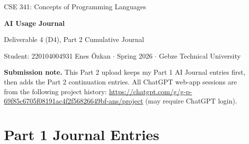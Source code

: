 \documentclass[11pt,a4paper]{article}
\newcommand{\field}[2]{\textbf{#1.} #2\par}
\begin{document}
\begin{center}
  {\footnotesize\color{anscaption}CSE 341: Concepts of Programming Languages\par}
  \vspace{3pt}
  {\huge\bfseries\sffamily AI Usage Journal\par}
  \vspace{4pt}
  {\large Deliverable 4 (D4), Part 2 Cumulative Journal\par}
  \vspace{6pt}
  {\footnotesize\color{anscaption}
    Student: 220104004931 Enes Özkan \(\cdot\)
    Spring 2026 \(\cdot\)
    Gebze Technical University\par}
\end{center}
\vspace{7pt}

\field{Submission note}{This Part 2 upload keeps my Part 1 AI Journal entries first, then adds the Part 2 continuation entries. All ChatGPT web-app sessions are from the following project history: \url{https://chatgpt.com/g/g-p-69f85c6705f08191ac4f2f56826649bf-ans/project} (may require ChatGPT login).}

\section{Part 1 Journal Entries}
\end{document}
